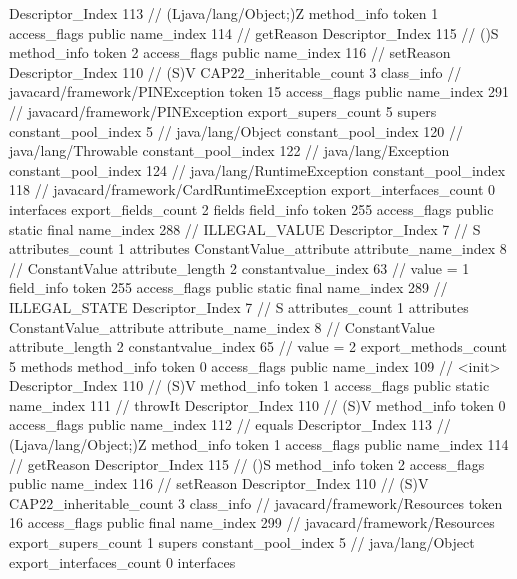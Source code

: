 {{{{{					Descriptor_Index	113		// (Ljava/lang/Object;)Z
				}
				method_info {
					token	1
					access_flags	public
					name_index	114		// getReason
					Descriptor_Index	115		// ()S
				}
				method_info {
					token	2
					access_flags	public
					name_index	116		// setReason
					Descriptor_Index	110		// (S)V
				}
			}
			CAP22_inheritable_count	3
		}
		class_info {		// javacard/framework/PINException
			token	15
			access_flags	public
			name_index	291		// javacard/framework/PINException
			export_supers_count	5
			supers {
				constant_pool_index	5		// java/lang/Object
				constant_pool_index	120		// java/lang/Throwable
				constant_pool_index	122		// java/lang/Exception
				constant_pool_index	124		// java/lang/RuntimeException
				constant_pool_index	118		// javacard/framework/CardRuntimeException
			}
			export_interfaces_count	0
			interfaces {
			}
			export_fields_count	2
			fields {
			field_info {
				token	255
				access_flags	public static final
				name_index	288		// ILLEGAL_VALUE
				Descriptor_Index	7		// S
				attributes_count	1
				attributes {
				ConstantValue_attribute {
					attribute_name_index	8		// ConstantValue
					attribute_length	2
					constantvalue_index	63		// value = 1
				}
				}
			}
			field_info {
				token	255
				access_flags	public static final
				name_index	289		// ILLEGAL_STATE
				Descriptor_Index	7		// S
				attributes_count	1
				attributes {
				ConstantValue_attribute {
					attribute_name_index	8		// ConstantValue
					attribute_length	2
					constantvalue_index	65		// value = 2
				}
				}
			}
			}
			export_methods_count	5
			methods {
				method_info {
					token	0
					access_flags	public
					name_index	109		// <init>
					Descriptor_Index	110		// (S)V
				}
				method_info {
					token	1
					access_flags	public static
					name_index	111		// throwIt
					Descriptor_Index	110		// (S)V
				}
				method_info {
					token	0
					access_flags	public
					name_index	112		// equals
					Descriptor_Index	113		// (Ljava/lang/Object;)Z
				}
				method_info {
					token	1
					access_flags	public
					name_index	114		// getReason
					Descriptor_Index	115		// ()S
				}
				method_info {
					token	2
					access_flags	public
					name_index	116		// setReason
					Descriptor_Index	110		// (S)V
				}
			}
			CAP22_inheritable_count	3
		}
		class_info {		// javacard/framework/Resources
			token	16
			access_flags	public final
			name_index	299		// javacard/framework/Resources
			export_supers_count	1
			supers {
				constant_pool_index	5		// java/lang/Object
			}
			export_interfaces_count	0
			interfaces {
			}
}}}
